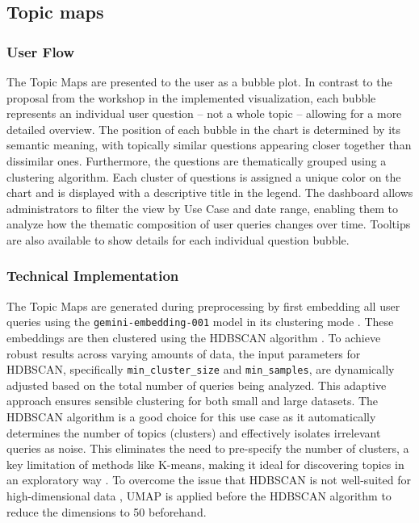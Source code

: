 \documentclass[
	english,
	ruledheaders=section,%
	class=report,%
	thesis={type=bachelor},%
	accentcolor=1b,%
	custommargins=true,%
	marginpar=false,%
	parskip=half-,%
	fontsize=11pt,%
	DIV=14,
]{tudapub}
\begin{document}
\subsection{Topic maps}
\subsubsection{User Flow}
The Topic Maps are presented to the user as a bubble plot. In contrast to the proposal from the workshop in the implemented visualization, each bubble represents an individual user question -- not a whole topic -- allowing for a more detailed overview. The position of each bubble in the chart is determined by its semantic meaning, with topically similar questions appearing closer together than dissimilar ones. Furthermore, the questions are thematically grouped using a clustering algorithm. Each cluster of questions is assigned a unique color on the chart and is displayed with a descriptive title in the legend. The dashboard allows administrators to filter the view by Use Case and date range, enabling them to analyze how the thematic composition of user queries changes over time. Tooltips are also available to show details for each individual question bubble.

\subsubsection{Technical Implementation}
The Topic Maps are generated during preprocessing by first embedding all user queries using the \texttt{gemini-embedding-001} model in its clustering mode \parencite{GoogleEmbedding001}. These embeddings are then clustered using the HDBSCAN algorithm \parencite{Malzer2021}. To achieve robust results across varying amounts of data, the input parameters for HDBSCAN, specifically \texttt{min\_cluster\_size} and \texttt{min\_samples}, are dynamically adjusted based on the total number of queries being analyzed. This adaptive approach ensures sensible clustering for both small and large datasets. The HDBSCAN algorithm is a good choice for this use case as it automatically determines the number of topics (clusters) and effectively isolates irrelevant queries as noise. This eliminates the need to pre-specify the number of clusters, a key limitation of methods like K-means, making it ideal for discovering topics in an exploratory way \parencite[p.~5]{Baligodugula2025}. To overcome the issue that HDBSCAN is not well-suited for high-dimensional data \parencite[p.~5]{Baligodugula2025}, UMAP \parencite{McInnes2020} is applied before the HDBSCAN algorithm to reduce the dimensions to 50 beforehand.
\end{document}
